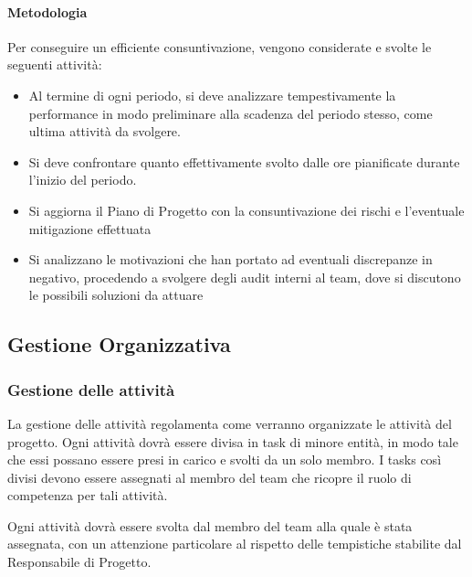 		\paragraph{Metodologia}
		Per conseguire un efficiente consuntivazione, vengono considerate e svolte le seguenti attività:
		
		\begin{itemize}
			\item Al termine di ogni periodo, si deve analizzare tempestivamente la performance in modo preliminare alla scadenza del periodo stesso, come ultima attività da svolgere.
			\item Si deve confrontare quanto effettivamente svolto dalle ore pianificate durante l'inizio del periodo.
			\item Si aggiorna il Piano di Progetto con la consuntivazione dei rischi e l'eventuale mitigazione effettuata
			\item Si analizzano le motivazioni che han portato ad eventuali discrepanze in negativo, procedendo a svolgere degli audit interni al team, dove si discutono le possibili soluzioni da attuare
		\end{itemize}
	
	\newpage	
	\subsection{Gestione Organizzativa}
		\subsubsection{Gestione delle attività}
		La gestione delle attività regolamenta come verranno organizzate le attività del progetto. Ogni attività dovrà essere divisa in task di minore entità, in modo tale che essi possano essere presi in carico e svolti da un solo membro. I tasks così divisi devono essere assegnati al membro del team che ricopre il ruolo di competenza per tali attività.
		
		Ogni attività dovrà essere svolta dal membro del team alla quale è stata assegnata, con un attenzione particolare al rispetto delle tempistiche stabilite dal Responsabile di Progetto.
		
